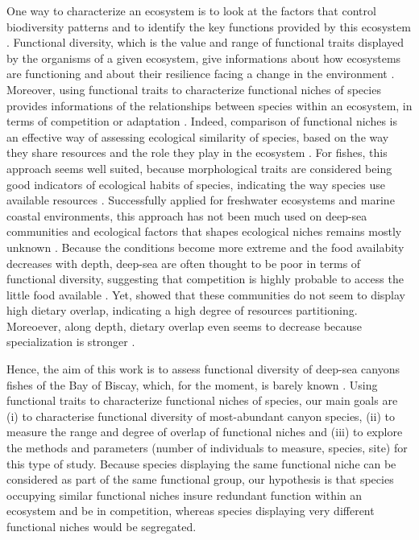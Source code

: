 One way to characterize an ecosystem is to look at the factors that control biodiversity patterns and to identify the key functions provided by this ecosystem \citep{aneeshkumar2017,brindamour2011,farre2016}. Functional diversity, which is the value and range of functional traits displayed by the organisms of a given ecosystem, give informations about how ecosystems are functioning and about their resilience facing a change in the environment \citep{dumay2004,martini2020}. Moreover, using functional traits to characterize functional niches of species provides informations of the relationships between species within an ecosystem, in terms of competition or adaptation \citep{aneeshkumar2017}. Indeed, comparison of functional niches is an effective way of assessing ecological similarity of species, based on the way they share resources and the role they play in the ecosystem \citep{aneeshkumar2017,farre2016,winemiller1991}.
For fishes, this approach seems well suited, because morphological traits are considered being good indicators of ecological habits of species, indicating the way species use available resources \citep{farre2016,winemiller1991}. Successfully applied for freshwater ecosystems and marine coastal environments, this approach has not been much used on deep-sea communities and ecological factors that shapes ecological niches remains mostly unknown \citet{aneeshkumar2017,farre2016}. Because the conditions become more extreme and the food availabity decreases with depth, deep-sea are often thought to be poor in terms of functional diversity, suggesting that competition is highly probable to access the little food available \citep{aneeshkumar2017}. Yet, \citet{preciado2017} showed that these communities do not seem to display high dietary overlap, indicating a high degree of resources partitioning. Moreoever, along depth, dietary overlap even seems to decrease because specialization is stronger \citep{carrasson2002}. 

Hence, the aim of this work is to assess functional diversity of deep-sea canyons fishes of the Bay of Biscay, which, for the moment, is barely known \citep{kenchington2020}. Using functional traits to characterize functional niches of species, our main goals are (i) to characterise functional diversity of most-abundant canyon species, (ii) to measure the range and degree of overlap of functional niches and (iii) to explore the methods and parameters (number of individuals to measure, species, site) for this type of study. Because species displaying the same functional niche can be considered as part of the same functional group, our hypothesis is that species occupying similar functional niches insure redundant function within an ecosystem and be in competition, whereas species displaying very different functional niches would be segregated. 

